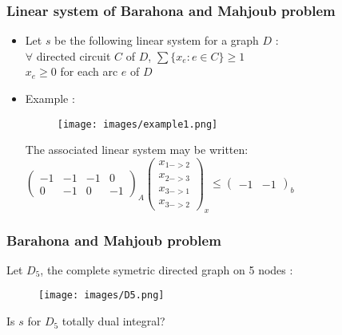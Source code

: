 \documentclass{beamer}
\begin{document}

\begin{frame}
	\frametitle{Linear system of Barahona and Mahjoub problem}
	\begin{itemize}
		\item
		Let $s$ be the following linear system for a graph $D$ :\\
		$\forall$ directed circuit $C$ of $D$, $\sum\{x_e:e\in C\}\geqslant 1$\\
		$x_e\geqslant 0$ for each arc $e$ of $D$ 
		\item
		Example : 
		\begin{figure}
			\centering
			\texttt{[image: images/example1.png]}
		\end{figure}
		The associated linear system may be written:\\
		$\begin{pmatrix} -1 & -1 & -1 & 0\\ 0 & -1 & 0 & -1 \end{pmatrix}_A \begin{pmatrix} x_{1->2}\\ x_{2->3}\\ x_{3->1}\\ x_{3->2} \end{pmatrix}_x \leqslant \begin{pmatrix} -1 & -1 \end{pmatrix}_b$\\
	\end{itemize}
\end{frame}
	
\begin{frame}
	\frametitle{Barahona and Mahjoub problem}
	Let $D_5$, the complete symetric directed graph on 5 nodes :
	\begin{figure}
		\centering
		\texttt{[image: images/D5.png]}
	\end{figure}
	Is $s$ for $D_5$ totally dual integral?
\end{frame}



\end{document}
